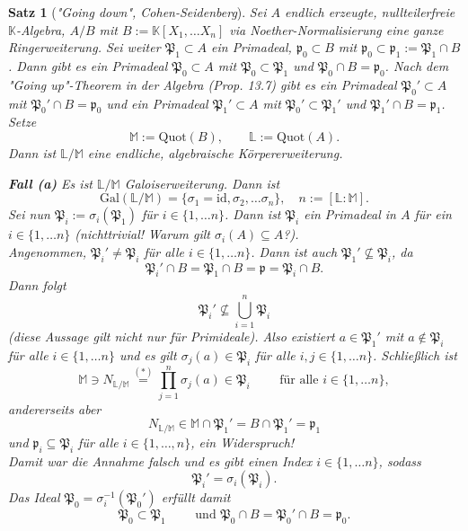 \documentclass[11pt]{book}
\newtheorem{theorem}{Satz}[section]
\theoremstyle{nonumberbreak}
\newenvironment{pr}[1][]{\ifthenelse{\equal{#1}{}}{\proof}{\proof[#1]}\rm}{\endproof}
\begin{document}
\begin{spacing}{1.3}
\begin{theorem}[\rm \it "Going down", Cohen-Seidenberg]

Sei $A$ endlich erzeugte, nullteilerfreie $\mathbb{K}$-Algebra, $A/B$ mit $B:= \mathbb{K}[X_1, \ldots X_n]$ via Noether-Normalisierung eine ganze Ringerweiterung. Sei weiter $\mathfrak{P}_1 \subset A$ ein Primadeal, $\mathfrak{p}_0 \subset B$ mit $\mathfrak{p}_0 \subset \mathfrak{p}_1:= \mathfrak{P}_1 \cap B$. Dann gibt es ein Primadeal $\mathfrak{P}_0 \subset A$ mit $\mathfrak{P}_0 \subset \mathfrak{P}_1$ und $\mathfrak{P}_0 \cap B = \mathfrak{p}_0$.
\begin{pr}
Nach dem "Going up"-Theorem in der Algebra (Prop. 13.7) gibt es ein Primadeal $\mathfrak{P}_0' \subset A$ mit $\mathfrak{P}_0' \cap B = \mathfrak{p}_0$ und ein Primadeal $\mathfrak{P}_1' \subset A$ mit $\mathfrak{P}_0' \subset \mathfrak{P}_1'$ und $\mathfrak{P}_1' \cap B = \mathfrak{p}_1$. Setze
$$\mathbb{M} := \textrm{Quot}(B), \qquad \mathbb{L} := \textrm{Quot}(A).$$
Dann ist $\mathbb{L}/\mathbb{M}$ eine endliche, algebraische Körpererweiterung.
\begin{compactenum}
\item[\textbf{Fall (a)}] Es ist $\mathbb{L}/\mathbb{M}$ Galoiserweiterung. Dann ist 
$$\textrm{Gal}(\mathbb{L}/\mathbb{M}) = \{ \sigma_1 = \textrm{id}, \sigma_2, \ldots \sigma_n \}, \quad n := [\mathbb{L}: \mathbb{M}].$$
Sei nun $\mathfrak{P}_i := \sigma_i( \mathfrak{P}_1)$ für $i \in \{1, \ldots n\}$. Dann ist $\mathfrak{P}_i$ ein Primadeal in $A$ für ein $i \in \{1, \ldots n \}$ (nichttrivial! Warum gilt $\sigma_i(A) \subseteq A$?).\\
Angenommen, $\mathfrak{P}_i' \neq \mathfrak{P}_i$ für alle $i \in \{1, \ldots n \}$. Dann ist auch $\mathfrak{P}_1' \nsubseteq \mathfrak{P}_i$, da
$$\mathfrak{P}_i' \cap B = \mathfrak{P}_1 \cap B = \mathfrak{p} = \mathfrak{P}_i \cap B.$$
Dann folgt
$$\mathfrak{P}_i' \nsubseteq \bigcup_{i=1}^n \mathfrak{P}_i$$
(diese Aussage gilt nicht nur für Primideale). Also existiert $a \in \mathfrak{P}_1'$ mit $a \notin \mathfrak{P}_i$ für alle $i \in \{1, \ldots n \}$ und es gilt $\sigma_j(a) \in \mathfrak{P}_i$ für alle $i,j \in \{1, \ldots n \}$. Schließlich ist
$$\mathbb{M} \ni N_{\mathbb{L}/\mathbb{M}} \overset{(*)}{=} \prod_{j=1}^n \sigma_j(a) \in \mathfrak{P}_i \qquad \textrm{ für alle } i \in \{1, \ldots n \},$$
andererseits aber $$N_{\mathbb{L}/\mathbb{M}} \in \mathbb{M} \cap \mathfrak{P}_1' = B \cap \mathfrak{P}_1' = \mathfrak{p}_1$$
und $\mathfrak{p}_i \subseteq \mathfrak{P}_i$ für alle $i \in \{1, \ldots, n \}$, ein Widerspruch!\\
Damit war die Annahme falsch und es gibt einen Index $i \in \{1, \ldots n \}$, sodass
$$\mathfrak{P}_i'= \sigma_i(\mathfrak{P}_i).$$
Das Ideal 
$\mathfrak{P}_0 = \sigma_i^{-1} ( \mathfrak{P}_0')$ erfüllt damit 
$$\mathfrak{P}_0 \subset \mathfrak{P}_1 \qquad \textrm{ und } \mathfrak{P}_0 \cap B = \mathfrak{P}_0' \cap B = \mathfrak{p}_0.$$


\end{compactenum}
\end{pr}
\end{theorem}
\end{spacing}
\end{document}
